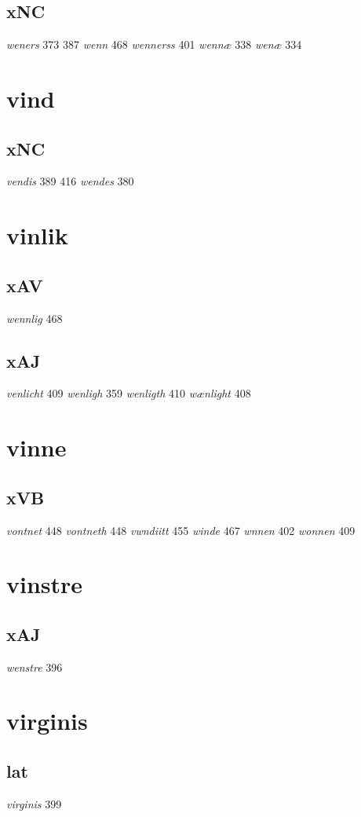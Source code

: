 \documentclass[a4paper,twocolumn]{article}
\begin{document}
\subsection{xNC}
\label{sec:orgee18e80}
\emph{weners} 373 387 \emph{wenn} 468 \emph{wennerss} 401 \emph{wennæ} 338 \emph{wenæ} 334 
\section{vind}
\label{sec:org18c734e}
\subsection{xNC}
\label{sec:org2e8981d}
\emph{vendis} 389 416 \emph{wendes} 380 
\section{vinlik}
\label{sec:orgdf33106}
\subsection{xAV}
\label{sec:org836598e}
\emph{wennlig} 468 
\subsection{xAJ}
\label{sec:org2cc3624}
\emph{venlicht} 409 \emph{wenligh} 359 \emph{wenligth} 410 \emph{wænlight} 408 
\section{vinne}
\label{sec:org9c60752}
\subsection{xVB}
\label{sec:org8ebd6b3}
\emph{vontnet} 448 \emph{vontneth} 448 \emph{vwndiitt} 455 \emph{winde} 467 \emph{wnnen} 402 \emph{wonnen} 409 
\section{vinstre}
\label{sec:orgbed46f9}
\subsection{xAJ}
\label{sec:org12fc3e7}
\emph{wenstre} 396 
\section{virginis}
\label{sec:org3f2d1db}
\subsection{lat}
\label{sec:orgd288b03}
\emph{virginis} 399 
\end{document}
